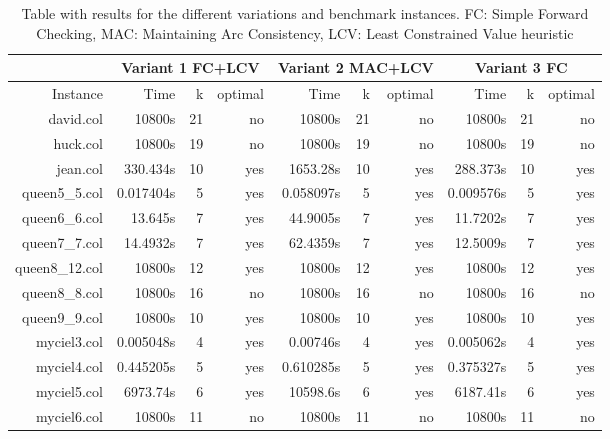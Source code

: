 \documentclass[a4paper]{scrartcl}
\begin{document}
\begin{table}
  \small
    \begin{adjustwidth}{-.5in}{-.5in}  
        \begin{center}
          \begin{tabular}{r | r | r | r | r | r | r | r | r | r}
            \hline
             & \multicolumn{3}{c|}{Variant 1 FC+LCV} & \multicolumn{3}{c|}{Variant 2 MAC+LCV} & \multicolumn{3}{c}{Variant 3 FC} \\
            \hline
Instance & Time & k & optimal &  Time & k & optimal & Time & k & optimal \\
\hline \hline 
david.col & 10800s & 21 & no & 10800s & 21 & no & 10800s & 21 & no  \\
huck.col & 10800s & 19 & no & 10800s & 19 & no & 10800s & 19 & no \\
jean.col & 330.434s & 10 & yes & 1653.28s & 10 & yes & 288.373s & 10 & yes \\
queen5\_5.col & 0.017404s & 5 & yes & 0.058097s & 5 & yes & 0.009576s & 5 & yes  \\
queen6\_6.col & 13.645s & 7 & yes &  44.9005s & 7 & yes  & 11.7202s & 7 & yes \\
queen7\_7.col & 14.4932s & 7 & yes  & 62.4359s & 7 & yes & 12.5009s  & 7 & yes \\
queen8\_12.col & 10800s & 12 & yes &  10800s & 12 & yes & 10800s & 12 & yes  \\
queen8\_8.col & 10800s & 16  & no  & 10800s & 16 & no & 10800s & 16 & no \\
queen9\_9.col & 10800s & 10 & yes & 10800s & 10 & yes & 10800s & 10 & yes \\
myciel3.col &  0.005048s & 4 & yes & 0.00746s & 4 & yes  & 0.005062s & 4  & yes \\
myciel4.col & 0.445205s &  5& yes & 0.610285s & 5 & yes & 0.375327s & 5 & yes  \\
myciel5.col & 6973.74s & 6 & yes &10598.6s  & 6 & yes & 6187.41s & 6  & yes \\
myciel6.col & 10800s & 11 & no & 10800s & 11  & no & 10800s & 11 & no \\
\hline
\end{tabular}
        \caption{Table with results for the different variations and benchmark instances. FC: Simple Forward Checking, MAC: Maintaining Arc Consistency, LCV: Least Constrained Value heuristic }
        \label{myTable1}
        \end{center}
    \end{adjustwidth}
\end{table}
\end{document}
